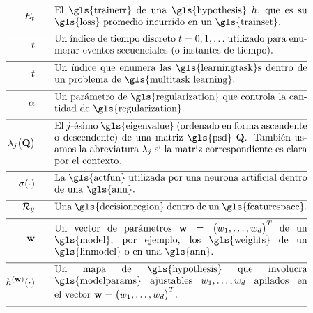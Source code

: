 \begin{align}
	\trainerror \quad\quad &\parbox{.75\textwidth}{El \gls{trainerr} de una \gls{hypothesis} $\hypothesis$, que es su 
		\gls{loss} promedio incurrido en un \gls{trainset}. }\nonumber \\[2mm] \hline \nonumber\\[-5mm]
	\timeidx \quad\quad &\parbox{.75\textwidth}{Un índice de tiempo discreto $\timeidx=0,1,\ldots$ utilizado para 
		enumerar eventos secuenciales (o instantes de tiempo). }\nonumber \\[2mm] \hline \nonumber\\[-5mm]
	\taskidx \quad\quad &\parbox{.75\textwidth}{Un índice que enumera las \gls{learningtask}s dentro de un problema de \gls{multitask learning}.}\nonumber \\[2mm] \hline \nonumber\\[-5mm]
	\regparam \quad\quad &\parbox{.75\textwidth}{Un parámetro de \gls{regularization} que controla 
		la cantidad de \gls{regularization}. } \nonumber \\[2mm] \hline \nonumber\\[-5mm]
	\eigval{\featureidx}\big( \mathbf{Q} \big) \quad\quad &\parbox{.75\textwidth}{El $\featureidx$-ésimo 
		\gls{eigenvalue} (ordenado en forma ascendente o descendente) de una matriz \gls{psd} $\mathbf{Q}$. 
		También usamos la abreviatura $\eigval{\featureidx}$ si la matriz correspondiente es clara por el contexto. }\nonumber \\[2mm] \hline \nonumber\\[-5mm]
	\actfun(\cdot) \quad\quad &\parbox{.75\textwidth}{La \gls{actfun} utilizada por una neurona artificial dentro de una \gls{ann}.}\nonumber \\[2mm] \hline \nonumber\\[-5mm]
	\decreg{\hat{\truelabel}} \quad\quad &\parbox{.75\textwidth}{Una \gls{decisionregion} dentro de un \gls{featurespace}.  }\nonumber \\[2mm] \hline \nonumber\\[-5mm]  
	\weights  \quad\quad & \parbox{.75\textwidth}{Un vector de parámetros $\weights = \big(\weight_{1},\ldots,\weight_{\featuredim}\big)^{T}$ 
		de un \gls{model}, por ejemplo, los \gls{weights} de un \gls{linmodel} o en una \gls{ann}.}     \nonumber \\[2mm] \hline \nonumber\\[-5mm]
	\hypothesis^{(\weights)}(\cdot)  \quad\quad &\parbox{.75\textwidth}{Un mapa de \gls{hypothesis} que involucra \gls{modelparams} ajustables $\weight_{1},\ldots,\weight_{\featuredim}$ apilados en el vector $\weights=\big(\weight_{1},\ldots,\weight_{\featuredim} \big)^{T}$.} \nonumber \\[2mm] \hline \nonumber\\[-5mm]

\end{align}
